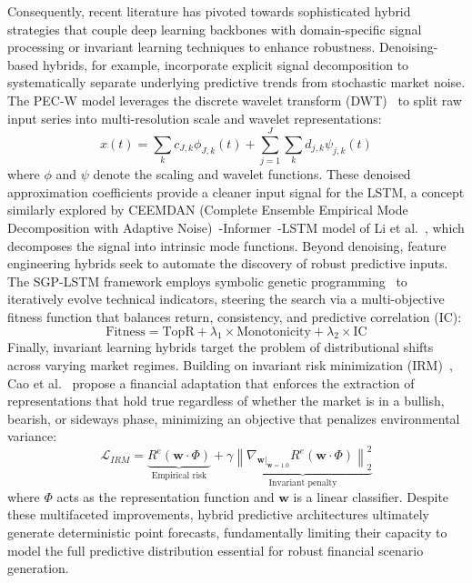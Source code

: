 Consequently, recent literature has pivoted towards sophisticated hybrid strategies that couple deep learning backbones with domain-specific signal processing or invariant learning techniques to enhance robustness. Denoising-based hybrids, for example, incorporate explicit signal decomposition to systematically separate underlying predictive trends from stochastic market noise. The PEC-W model \citep{caliskan2025} leverages the discrete wavelet transform (DWT)~\citep{mallat1989theory} to split raw input series into multi-resolution scale and wavelet representations:
\begin{equation}
x(t) = \sum_k c_{J,k} \phi_{J,k}(t) + \sum_{j=1}^J \sum_k d_{j,k} \psi_{j,k}(t)
\end{equation}
where $\phi$ and $\psi$ denote the scaling and wavelet functions. These denoised approximation coefficients provide a cleaner input signal for the LSTM, a concept similarly explored by CEEMDAN (Complete Ensemble Empirical Mode Decomposition with Adaptive Noise)~\citep{torres2011complete}-Informer~\citep{zhou2021informer}-LSTM model of Li et al.~\citep{li2025ceemdan}, which decomposes the signal into intrinsic mode functions. Beyond denoising, feature engineering hybrids seek to automate the discovery of robust predictive inputs. The SGP-LSTM framework \citep{SGP-LSTM1} employs symbolic genetic programming~\citep{koza1992genetic} to iteratively evolve technical indicators, steering the search via a multi-objective fitness function that balances return, consistency, and predictive correlation (IC):
\begin{equation}
\text{Fitness} = \text{TopR} + \lambda_1 \times \text{Monotonicity} + \lambda_2 \times \text{IC}
\end{equation}
Finally, invariant learning hybrids target the problem of distributional shifts across varying market regimes. Building on invariant risk minimization (IRM)~\citep{arjovsky2019invariant}, Cao et al.~\citep{cao2023irm} propose a financial adaptation that enforces the extraction of representations that hold true regardless of whether the market is in a bullish, bearish, or sideways phase, minimizing an objective that penalizes environmental variance:
\begin{equation}
\mathcal{L}_{IRM} = \underbrace{R^e(\mathbf{w} \cdot \Phi)}_{\text{Empirical risk}} + \gamma \underbrace{\left\| \nabla_{\mathbf{w}|_{\mathbf{w}=1.0}} R^e(\mathbf{w} \cdot \Phi) \right\|_2^2}_{\text{Invariant penalty}}
\end{equation}
where $\Phi$ acts as the representation function and $\mathbf{w}$ is a linear classifier. Despite these multifaceted improvements, hybrid predictive architectures ultimately generate deterministic point forecasts, fundamentally limiting their capacity to model the full predictive distribution essential for robust financial scenario generation.

